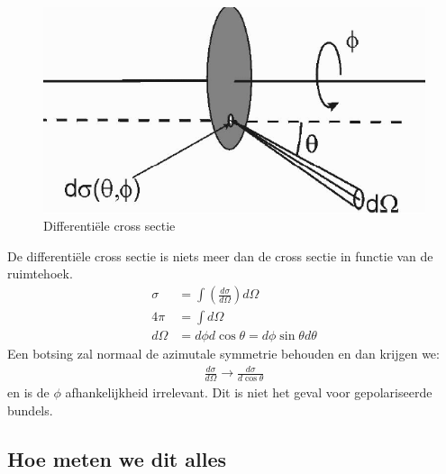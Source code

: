 \documentclass[../main.tex]{subfiles}
\begin{document}
\begin{figure}[h]
    \centering
    \includegraphics[width=0.8\linewidth]{introduction_and_review/dif_cross_sec.png}
    \caption{Differentiële cross sectie}%
    \label{fig:dif_cross_sec}
\end{figure}

De differentiële cross sectie is niets meer dan de cross sectie in functie van de ruimtehoek.
\begin{equation}
    \begin{aligned}
        \label{eq:dif_cross_sec}
        \sigma&=\int \left(\frac{d\sigma}{d\Omega}\right)d\Omega\\
        4\pi&=\int d\Omega\\
        d\Omega &= d\phi d\cos\theta = d\phi\sin\theta d\theta
    \end{aligned}
\end{equation}
Een botsing zal normaal de azimutale symmetrie behouden en dan krijgen we:
\begin{equation}
    \begin{aligned}
        \label{eq:dif_cross_sec_az_sym}
        \frac{d\sigma}{d\Omega}\rightarrow \frac{d\sigma}{d\cos\theta}
    \end{aligned}
\end{equation}
en is de $\phi$ afhankelijkheid irrelevant. Dit is niet het geval voor gepolariseerde bundels.\\

\subsection{Hoe meten we dit alles}%
\label{sub:hoe_meten_we_dit_alles}
\end{document}
